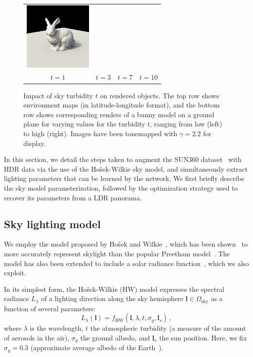\begin{figure}
\begin{tabular}{cccc}
\includegraphics[width=.24\linewidth]{figures/hwmodel/t_10.png} \\
$t = 1$ & $t = 3$ & $t = 7$ & $t = 10$ 
\end{tabular}
\caption{Impact of sky turbidity $t$ on rendered objects. The top row shows environment maps (in latitude-longitude format), and the bottom row shows corresponding renders of a bunny model on a ground plane for varying values for the turbidity $t$, ranging from low (left) to high (right). Images have been tonemapped with $\gamma = 2.2$ for display.}
\label{fig:turbidity-comparison}
\end{figure}

In this section, we detail the steps taken to augment the SUN360 dataset~\cite{xiao-cvpr-12} with HDR data via the use of the Ho\v{s}ek-Wilkie sky model, and simultaneously extract lighting parameters that can be learned by the network. We first briefly describe the sky model parameterization, followed by the optimization strategy used to recover its parameters from a LDR panorama. 

\subsection{Sky lighting model}

We employ the model proposed by Ho\v{s}ek and Wilkie~\cite{hosek-siggraph-12}, which has been shown~\cite{kider-tog-14} to more accurately represent skylight than the popular Preetham model~\cite{preetham-siggraph-99}. The model has also been extended to include a solar radiance function~\cite{hosek-cga-13}, which we also exploit.

In its simplest form, the Ho\v{s}ek-Wilkie (HW) model expresses the spectral radiance $L_\lambda$ of a lighting direction along the sky hemisphere $\mathbf{l} \in \Omega_\text{sky}$ as a function of several parameters:
%
\begin{equation}
L_\lambda(\mathbf{l}) = f_\text{HW}(\mathbf{l}, \lambda, t, \sigma_g, \mathbf{l}_s) \,,
\end{equation}
%
where $\lambda$ is the wavelength, $t$ the atmospheric turbidity (a measure of the amount of aerosols in the air), $\sigma_g$ the ground albedo, and $\mathbf{l}_s$ the sun position. Here, we fix $\sigma_g = 0.3$ (approximate average albedo of the Earth~\cite{goode-grl-01}). 

